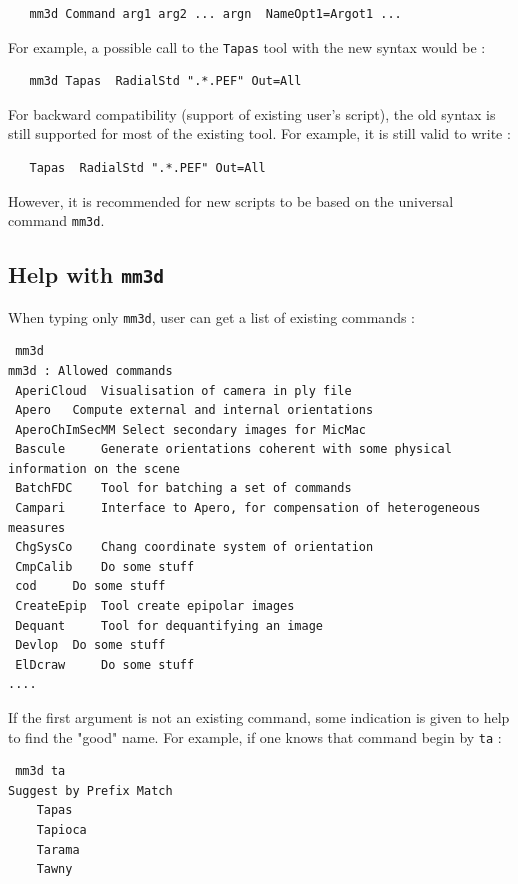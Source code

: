 \begin{verbatim}
   mm3d Command arg1 arg2 ... argn  NameOpt1=Argot1 ...
\end{verbatim}

For example, a possible call to the {\tt Tapas} tool with the new syntax would be :

\begin{verbatim}
   mm3d Tapas  RadialStd ".*.PEF" Out=All
\end{verbatim}


For backward compatibility (support of existing user's script), the old syntax is still supported
for most of the existing tool. For example, it is still valid to write :

\begin{verbatim}
   Tapas  RadialStd ".*.PEF" Out=All
\end{verbatim}

However, it is recommended for new scripts to be based on the universal command {\tt mm3d}.



\subsection{Help with {\tt mm3d}}

When typing only {\tt mm3d}, user can get a list of existing commands :


\begin{verbatim}
 mm3d
mm3d : Allowed commands 
 AperiCloud	 Visualisation of camera in ply file
 Apero	 Compute external and internal orientations
 AperoChImSecMM	Select secondary images for MicMac 
 Bascule	 Generate orientations coherent with some physical information on the scene
 BatchFDC	 Tool for batching a set of commands
 Campari	 Interface to Apero, for compensation of heterogeneous measures
 ChgSysCo	 Chang coordinate system of orientation
 CmpCalib	 Do some stuff
 cod	 Do some stuff
 CreateEpip	 Tool create epipolar images
 Dequant	 Tool for dequantifying an image
 Devlop	 Do some stuff
 ElDcraw	 Do some stuff
....
\end{verbatim}

If the first argument is not an existing command, some indication is given to help to find 
the "good" name. For example, if one knows that command begin by {\tt ta}  :

\begin{verbatim}
 mm3d ta
Suggest by Prefix Match
    Tapas
    Tapioca
    Tarama
    Tawny
\end{verbatim}

